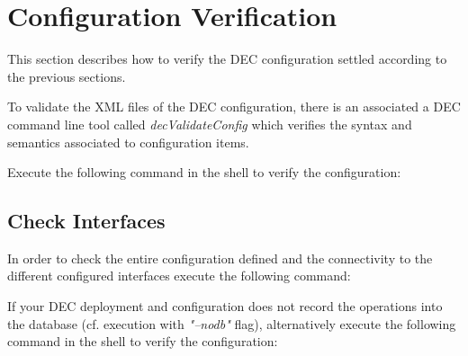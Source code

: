 \documentclass[dec_sum_main.tex]{subfiles}
\begin{document}

\section{Configuration Verification}
This section describes how to verify the DEC configuration settled according to the previous sections. 


To validate the XML files of the DEC configuration, there is an associated a DEC command line tool called \textit{decValidateConfig} which verifies the syntax and semantics associated to  configuration items. \newline

\par 
\noindent
Execute the following command in the shell to verify the configuration:

 \newline

\par 

\subsection{Check Interfaces}
\noindent
In order to check the entire configuration defined and the connectivity to the different configured interfaces execute the following command:

 \newline


\par 
\noindent
If your DEC deployment and configuration does not record the operations into the database (cf. execution with \textit{"--nodb"} flag), alternatively execute the following command in the shell to verify the configuration:

 \newline
\end{document}
